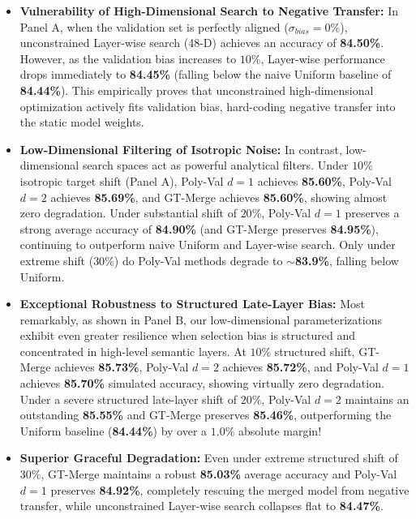 \documentclass{article}
\theoremstyle{plain}
\theoremstyle{definition}
\theoremstyle{remark}
\begin{document}
\begin{itemize}
    \item \textbf{Vulnerability of High-Dimensional Search to Negative Transfer:} In Panel A, when the validation set is perfectly aligned ($\sigma_{bias} = 0\%$), unconstrained Layer-wise search (48-D) achieves an accuracy of \textbf{84.50\%}. However, as the validation bias increases to $10\%$, Layer-wise performance drops immediately to \textbf{84.45\%} (falling below the naive Uniform baseline of \textbf{84.44\%}). This empirically proves that unconstrained high-dimensional optimization actively fits validation bias, hard-coding negative transfer into the static model weights.
    \item \textbf{Low-Dimensional Filtering of Isotropic Noise:} In contrast, low-dimensional search spaces act as powerful analytical filters. Under $10\%$ isotropic target shift (Panel A), Poly-Val $d=1$ achieves \textbf{85.60\%}, Poly-Val $d=2$ achieves \textbf{85.69\%}, and GT-Merge achieves \textbf{85.60\%}, showing almost zero degradation. Under substantial shift of $20\%$, Poly-Val $d=1$ preserves a strong average accuracy of \textbf{84.90\%} (and GT-Merge preserves \textbf{84.95\%}), continuing to outperform naive Uniform and Layer-wise search. Only under extreme shift ($30\%$) do Poly-Val methods degrade to $\sim$\textbf{83.9\%}, falling below Uniform.
    \item \textbf{Exceptional Robustness to Structured Late-Layer Bias:} Most remarkably, as shown in Panel B, our low-dimensional parameterizations exhibit even greater resilience when selection bias is structured and concentrated in high-level semantic layers. At $10\%$ structured shift, GT-Merge achieves \textbf{85.73\%}, Poly-Val $d=2$ achieves \textbf{85.72\%}, and Poly-Val $d=1$ achieves \textbf{85.70\%} simulated accuracy, showing virtually zero degradation. Under a severe structured late-layer shift of $20\%$, Poly-Val $d=2$ maintains an outstanding \textbf{85.55\%} and GT-Merge preserves \textbf{85.46\%}, outperforming the Uniform baseline (\textbf{84.44\%}) by over a $1.0\%$ absolute margin!
    \item \textbf{Superior Graceful Degradation:} Even under extreme structured shift of $30\%$, GT-Merge maintains a robust \textbf{85.03\%} average accuracy and Poly-Val $d=1$ preserves \textbf{84.92\%}, completely rescuing the merged model from negative transfer, while unconstrained Layer-wise search collapses flat to \textbf{84.47\%}.
\end{itemize}
\end{document}
